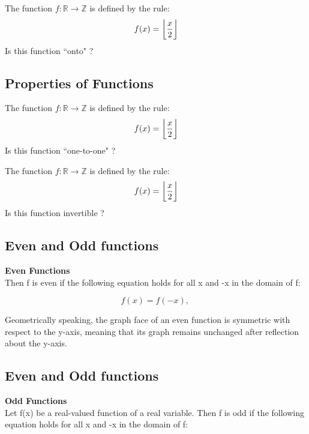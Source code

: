 \documentclass[a4paper,12pt]{article}
\begin{document}
The function $f : \mathbb{R} \rightarrow \mathbb{Z}$ is defined by the rule:
\[f(x) = \bigg\lfloor  {x \over 2}\bigg\rfloor \]
Is this function ``onto" ?




\subsection{Properties of Functions}

The function $f : \mathbb{R} \rightarrow \mathbb{Z}$ is defined by the rule:
\[f(x) = \bigg\lfloor  {x \over 2}\bigg\rfloor \]
Is this function ``one-to-one" ?



The function $f : \mathbb{R} \rightarrow \mathbb{Z}$ is defined by the rule:
\[f(x) = \bigg\lfloor  {x \over 2}\bigg\rfloor \]
Is this function invertible ?



\subsection{Even and Odd functions}

\textbf{Even Functions}\\
Then f is even if the following equation holds for all x and -x in the domain of f:

\[f(x) = f(-x), \,\]

Geometrically speaking, the graph face of an even function is symmetric with respect to the y-axis, meaning that its graph remains unchanged after reflection about the y-axis.



\subsection{Even and Odd functions}

\textbf{Odd Functions}\\
Let f(x) be a real-valued function of a real variable. Then f is odd if the following equation holds for all x and -x in the domain of f:
\end{document}
